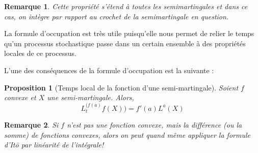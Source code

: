 \documentclass[openany]{book}
\newcommand{\1}{\mathbbm{1}}
\theoremstyle{thmfont}
\theoremstyle{deffont}
\theoremstyle{thmfont}
\newtheorem{prop}[prop]{Proposition}
\theoremstyle{deffont}
\newtheorem*{remark}{Remarque}
\begin{document}
\begin{remark}
  Cette propriété s'étend à toutes les semimartingales et dans ce cas, on intègre par rapport au crochet de la semimartingale en question.
\end{remark}

La formule d'occupation est très utile puisqu'elle nous permet de relier le temps qu’un processus stochastique passe dans un certain ensemble à des propriétés locales de ce processus.

L'une des conséquences de la formule d'occupation est la suivante :

\begin{prop}[Temps local de la fonction d'une semi-martingale]
  Soient $f$ convexe et $X$ une semi-martingale. Alors,
  $$L_t^{(f(a)}f(X)) = f'(a) L^a(X)$$
\end{prop}

\begin{remark}
  Si $f$ n'est pas une fonction convexe, mais la différence (ou la somme) de fonctions convexes, alors on peut quand même appliquer la formule d'Itō par linéarité de l'intégrale!
\end{remark}
\end{document}
